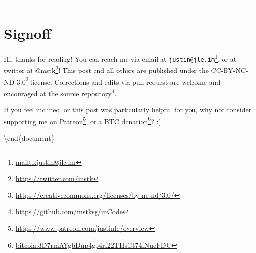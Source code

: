 \documentclass[]{article}
\renewcommand{\href}[2]{#2\footnote{\url{#1}}}
\begin{document}
\begin{center}\rule{0.5\linewidth}{0.5pt}\end{center}

\section{Signoff}\label{signoff}

Hi, thanks for reading! You can reach me via email at
\href{mailto:justin@jle.im}{\nolinkurl{justin@jle.im}}, or at twitter at
\href{https://twitter.com/mstk}{@mstk}! This post and all others are published
under the \href{https://creativecommons.org/licenses/by-nc-nd/3.0/}{CC-BY-NC-ND
3.0} license. Corrections and edits via pull request are welcome and encouraged
at \href{https://github.com/mstksg/inCode}{the source repository}.

If you feel inclined, or this post was particularly helpful for you, why not
consider \href{https://www.patreon.com/justinle/overview}{supporting me on
Patreon}, or a \href{bitcoin:3D7rmAYgbDnp4gp4rf22THsGt74fNucPDU}{BTC donation}?
:)

\textbackslash end\{document\}
\end{document}
